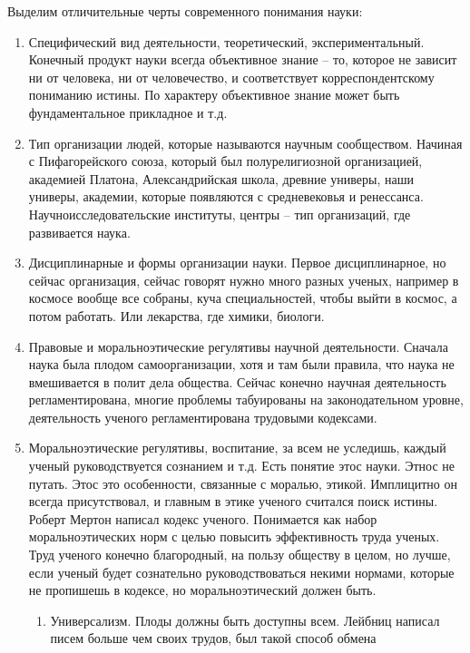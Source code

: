 \documentclass[a4paper, 12pt]{article}
\def\-{\babelhyphen{hard}}
\begin{document}
Выделим отличительные черты современного понимания науки:
\begin{enumerate}
  \item Специфический вид деятельности, теоретический, 
    экспериментальный. Конечный продукт науки всегда объективное знание 
    -- то, которое не зависит ни от человека, ни от человечество, 
    и соответствует корреспондентскому пониманию истины. По характеру 
    объективное знание может быть фундаментальное прикладное и т.д.
  \item Тип организации людей, которые называются научным сообществом. 
    Начиная с Пифагорейского союза, который был полурелигиозной 
    организацией, академией Платона, Александрийская школа, древние 
    универы, наши универы, академии, которые появляются с средневековья 
    и ренессанса. Научно\-исследовательские институты, центры -- тип 
    организаций, где развивается наука.
  \item Дисциплинарные и формы организации науки. Первое дисциплинарное, 
    но сейчас организация, сейчас говорят нужно много разных ученых, 
    например в космосе вообще все собраны, куча специальностей, чтобы 
    выйти в космос, а потом работать. Или лекарства, где химики, 
    биологи.
  \item Правовые и морально\-этические регулятивы научной деятельности. 
    Сначала наука была плодом самоорганизации, хотя и там были правила, 
    что наука не вмешивается в полит дела общества. Сейчас конечно 
    научная деятельность регламентирована, многие проблемы табуированы 
    на законодательном уровне, деятельность ученого регламентирована 
    трудовыми кодексами.
  \item Морально\-этические регулятивы, воспитание, за всем не уследишь, 
    каждый ученый руководствуется сознанием и т.д. Есть понятие этос 
    науки. Этнос не путать. Этос это особенности, связанные с моралью, 
    этикой. Имплицитно он всегда присутствовал, и главным в этике 
    ученого считался поиск истины. Роберт Мертон написал кодекс ученого. 
    Понимается как набор морально\-этических норм с целью повысить 
    эффективность труда ученых. Труд ученого конечно благородный, на 
    пользу обществу в целом, но лучше, если ученый будет сознательно 
    руководствоваться некими нормами, которые не пропишешь в кодексе, но 
    морально\-этический должен быть.
    \begin{enumerate}
      \item Универсализм. Плоды должны быть доступны всем. Лейбниц 
        написал писем больше чем своих трудов, был такой способ обмена 

\end{enumerate}
\end{enumerate}
\end{document}
